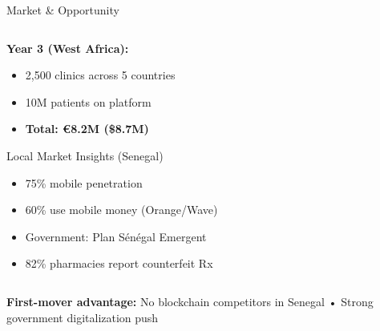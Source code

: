 \documentclass[aspectratio=169,xcolor=dvipsnames,14pt]{beamer}
\newcommand{\checkitem}{\item[\color{SuccessGreen}\faCheckCircle]}
\begin{document}
\begin{frame}{Market \& Opportunity}
\begin{columns}[T]
\begin{column}{0.5\textwidth}
      \vspace{0.2cm}

      \textbf{Year 3 (West Africa):}
      \begin{itemize}
        \item 2,500 clinics across 5 countries
        \item 10M patients on platform
        \item \textbf{Total: €8.2M (\$8.7M)}
      \end{itemize}

      \vspace{0.3cm}

      \begin{block}{Local Market Insights (Senegal)}
        \begin{itemize}
          \checkitem 75\% mobile penetration
          \checkitem 60\% use mobile money (Orange/Wave)
          \checkitem Government: Plan Sénégal Emergent
          \checkitem 82\% pharmacies report counterfeit Rx
        \end{itemize}
      \end{block}
    \end{column}
  \end{columns}

  \vspace{0.3cm}

  \begin{center}
    \textbf{First-mover advantage:} No blockchain competitors in Senegal • Strong government digitalization push
  \end{center}

\end{frame}
\end{document}
